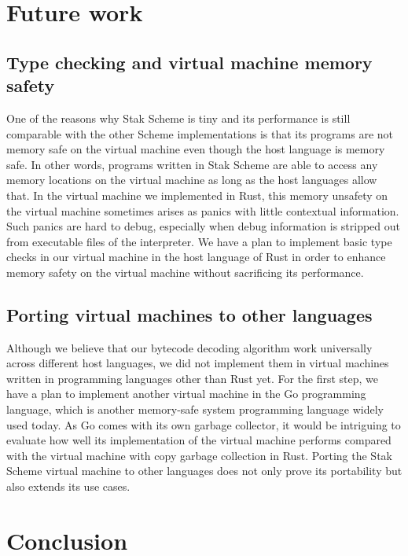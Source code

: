 \documentclass[sigplan, anonymous, review]{acmart}
\begin{document}
\section{Future work}

\subsection{Type checking and virtual machine memory safety}

One of the reasons why Stak Scheme is tiny and its performance is still
comparable with the other Scheme implementations is that its
programs are not memory safe on the virtual machine even though
the host language is memory safe.
In other words, programs written in Stak Scheme are able to access any memory
locations on the virtual machine as long as the host languages allow that.
In the virtual machine we implemented in Rust, this memory
unsafety on the virtual machine sometimes arises as panics with little
contextual information.
Such panics are hard to debug, especially when debug information is
stripped out from executable files of the interpreter.
We have a plan to implement basic type checks in our virtual machine
in the host language of Rust in order to enhance memory safety on
the virtual machine without sacrificing its performance.

\subsection{Porting virtual machines to other languages} \label{portvm}

Although we believe that our bytecode decoding algorithm work
universally across different host languages, we did not implement them in
virtual machines written in programming languages other than Rust yet.
For the first step, we have a plan to implement another virtual
machine in the Go programming language, which is another memory-safe system
programming language widely used today.
As Go comes with its own garbage collector,
it would be intriguing to evaluate how well its implementation of the
virtual machine performs compared with the virtual
machine with copy garbage collection in Rust.
Porting the Stak Scheme virtual machine to other languages does
not only prove its portability but also extends its use cases.

\section{Conclusion}
\end{document}
